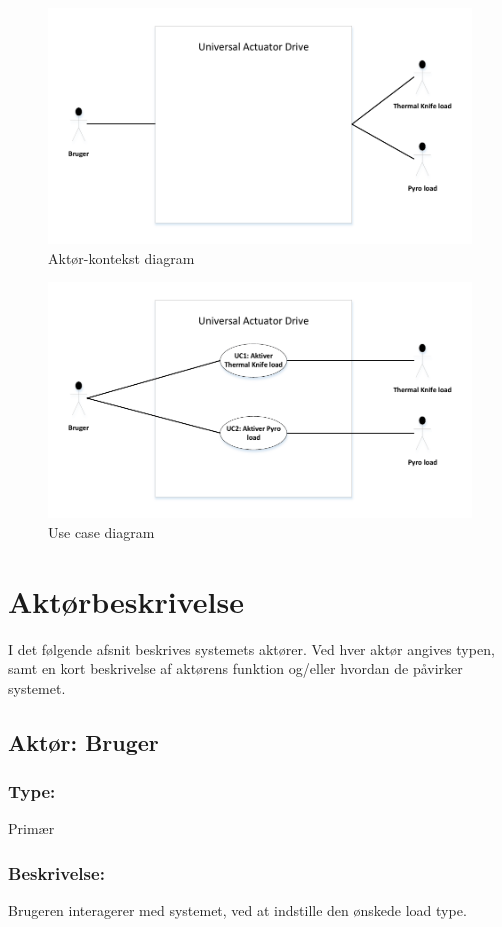 \begin{figure}[H]
	\centering
	\includegraphics{tex/Kravspecifikation/billeder/AktorkontekstdiagramV1.pdf}
	\caption{Aktør-kontekst diagram}
\end{figure}

\begin{figure}[H]
	\centering
	\includegraphics{tex/Kravspecifikation/billeder/UseCasediagramV1.pdf}
	\caption{Use case diagram}
\end{figure}




\section{Aktørbeskrivelse}
I det følgende afsnit beskrives systemets aktører. Ved hver aktør angives typen, samt en kort beskrivelse af aktørens funktion og/eller hvordan de påvirker systemet.

\begin{framed}
	\subsection{Aktør: Bruger}
	\subsubsection*{Type:}
		Primær
	
	\subsubsection*{Beskrivelse:}
		Brugeren interagerer med systemet, ved at indstille den ønskede load type.
\end{framed}

